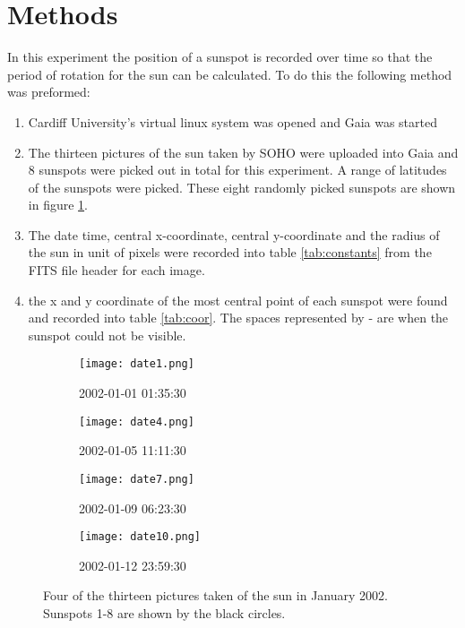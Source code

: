 \documentclass[10pt]{article}
\begin{document}
\newpage

\section{Methods}

In this experiment the position of a sunspot is recorded over time so that the period of rotation for the sun can be calculated. To do this the following method was preformed:

\begin{enumerate}
	\item Cardiff University's virtual linux system was opened and Gaia was started
	\item The thirteen pictures of the sun taken by SOHO were uploaded into Gaia and 8 sunspots were picked out in total for this experiment. A range of latitudes of the sunspots were picked. These eight randomly picked sunspots are shown in figure \ref{fig:pic}.
	\item The date time, central x-coordinate, central y-coordinate and the radius of the sun in unit of pixels were recorded into table \ref{tab:constants} from the FITS file header for each image.
	\item the x and y coordinate of the most central point of each sunspot were found and recorded into table \ref{tab:coor}. The spaces represented by - are when the sunspot could not be visible.
\end{enumerate}

\begin{figure}[H]
	\centering
	\begin{subfigure}[t]{0.244\textwidth}
		\centering
		\texttt{[image: date1.png]}
		\caption{2002-01-01 01:35:30}	
	\end{subfigure}
	\hfill
	\begin{subfigure}[t]{0.24\textwidth}
		\centering
		\texttt{[image: date4.png]}
		\caption{2002-01-05 11:11:30}	
	\end{subfigure}
	\hfill
	\begin{subfigure}[t]{0.24\textwidth}
		\centering
		\texttt{[image: date7.png]}
		\caption{2002-01-09 06:23:30}	
	\end{subfigure}
	\hfill
	\begin{subfigure}[t]{0.236\textwidth}
		\centering
		\texttt{[image: date10.png]}
		\caption{2002-01-12 23:59:30}	
	\end{subfigure}
	\caption{Four of the thirteen pictures taken of the sun in January 2002. Sunspots 1-8 are shown by the black circles.}
	\label{fig:pic}
\end{figure}
\end{document}
